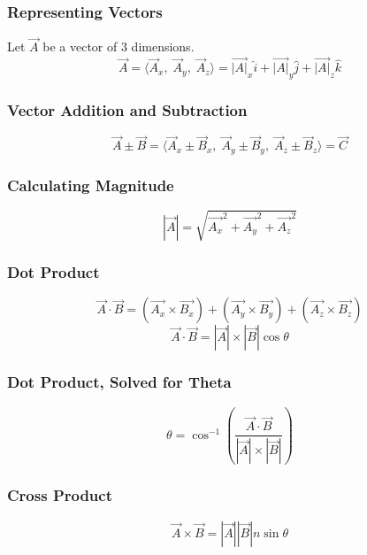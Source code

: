\documentclass{article}
\begin{document}
\subsubsection{Representing Vectors}
Let $\vec{A}$ be a vector of 3 dimensions.
\begin{equation}
    \vec{A} = \langle \vec{A}_x, \; \vec{A}_y, \; \vec{A}_z \rangle = \vec{|A|}_x \hat{i} + \vec{|A|}_y \hat{j} + \vec{|A|}_z \hat{k}
\end{equation}

\subsubsection{Vector Addition and Subtraction}
\begin{equation}
    \vec{A} \pm \vec{B} = \langle \vec{A}_x \pm \vec{B}_x, \; \vec{A}_y \pm \vec{B}_y, \; \vec{A}_z \pm \vec{B}_z \rangle = \vec{C}
\end{equation}

\subsubsection{Calculating Magnitude}
\begin{equation}
    |\vec{A}| = \sqrt{\vec{A_x}^2 + \vec{A_y}^2 + \vec{A_z}^2} 
\end{equation}

\subsubsection{Dot Product}
\begin{equation}
    \vec{A} \cdot \vec{B} = (\vec{A_x} \times \vec{B_x}) + (\vec{A_y} \times \vec{B_y}) + (\vec{A_z} \times \vec{B_z})
\end{equation}
\begin{equation}
    \vec{A} \cdot \vec{B} = |\vec{A}| \times |\vec{B}|\cos{\theta}
\end{equation}

\subsubsection{Dot Product, Solved for Theta}
\begin{equation}
    \theta = \cos^{-1} \left( {\frac{\vec{A} \cdot \vec{B}}{|\vec{A}| \times |\vec{B}|}} \right)
\end{equation}

\subsubsection{Cross Product}
\begin{equation}
    \vec{A} \times \vec{B} = |\vec{A}||\vec{B}| n \sin \theta
\end{equation}
\end{document}
